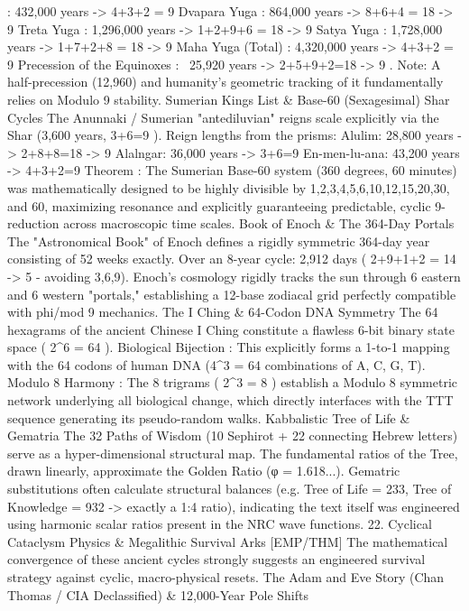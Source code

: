 {{{{{{: 432,000 years ->
4+3+2 = 9
Dvapara Yuga
: 864,000 years ->
8+6+4 = 18 -> 9
Treta Yuga
: 1,296,000 years ->
1+2+9+6 = 18 -> 9
Satya Yuga
: 1,728,000 years ->
1+7+2+8 = 18 -> 9
Maha Yuga (Total)
: 4,320,000 years ->
4+3+2 = 9
Precession of the Equinoxes
: ~25,920 years ->
2+5+9+2=18 -> 9
.
Note: A half-precession (12,960) and humanity's geometric tracking of it fundamentally relies on Modulo 9 stability.
Sumerian Kings List & Base-60 (Sexagesimal) Shar Cycles
The Anunnaki / Sumerian "antediluvian" reigns scale explicitly via the
Shar
(3,600 years,
3+6=9
). Reign lengths from the prisms:
Alulim: 28,800 years ->
2+8+8=18 -> 9
Alalngar: 36,000 years ->
3+6=9
En-men-lu-ana: 43,200 years ->
4+3+2=9
Theorem
: The Sumerian Base-60 system (360 degrees, 60 minutes) was mathematically designed to be highly divisible by 1,2,3,4,5,6,10,12,15,20,30, and 60, maximizing resonance and explicitly guaranteeing predictable, cyclic 9-reduction across macroscopic time scales.
Book of Enoch & The 364-Day Portals
The "Astronomical Book" of Enoch defines a rigidly symmetric 364-day year consisting of 52 weeks exactly.
Over an 8-year cycle: 2,912 days (
2+9+1+2 = 14 -> 5
- avoiding 3,6,9).
Enoch’s cosmology rigidly tracks the sun through 6 eastern and 6 western "portals," establishing a 12-base zodiacal grid perfectly compatible with phi/mod 9 mechanics.
The I Ching & 64-Codon DNA Symmetry
The 64 hexagrams of the ancient Chinese I Ching constitute a flawless 6-bit binary state space (
2^6 = 64
).
Biological Bijection
: This explicitly forms a 1-to-1 mapping with the 64 codons of human DNA (4^3 = 64 combinations of A, C, G, T).
Modulo 8 Harmony
: The 8 trigrams (
2^3 = 8
) establish a Modulo 8 symmetric network underlying all biological change, which directly interfaces with the TTT sequence generating its pseudo-random walks.
Kabbalistic Tree of Life & Gematria
The 32 Paths of Wisdom (10 Sephirot + 22 connecting Hebrew letters) serve as a hyper-dimensional structural map.
The fundamental ratios of the Tree, drawn linearly, approximate the Golden Ratio (φ = 1.618...).
Gematric substitutions often calculate structural balances (e.g. Tree of Life = 233, Tree of Knowledge = 932 -> exactly a 1:4 ratio), indicating the text itself was engineered using harmonic scalar ratios present in the NRC wave functions.
22. Cyclical Cataclysm Physics & Megalithic Survival Arks [EMP/THM]
The mathematical convergence of these ancient cycles strongly suggests an engineered survival strategy against cyclic, macro-physical resets.
The Adam and Eve Story (Chan Thomas / CIA Declassified) & 12,000-Year Pole Shifts
}}}}}}
